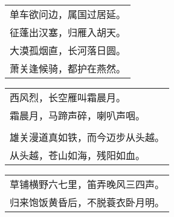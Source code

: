 \nopagebreak%
\nopagebreak%
\noindent\begin{minipage}{\linewidth}
  \vskip-3pt\begin{table}[H]
    \centering
    \begin{tabular}{@{}l@{}}
单车欲问边，属国过居延。\\
征蓬出汉塞，归雁入胡天。\\
大漠孤烟直，长河落日圆。\\
萧关逢候骑，都护在燕然。
    \end{tabular}
  \end{table}
\end{minipage}
\vspace{1cm}


\nopagebreak%
\nopagebreak%
\noindent\begin{minipage}{\linewidth}
  \vskip-3pt\begin{table}[H]
    \centering
    \begin{tabular}{@{}l@{}}
西风烈，长空雁叫霜晨月。\\
霜晨月，马蹄声碎，喇叭声咽。\\
\\
雄关漫道真如铁，而今迈步从头越。\\
从头越，苍山如海，残阳如血。
    \end{tabular}
  \end{table}
\end{minipage}
\vspace{1cm}


\nopagebreak%
\nopagebreak%
\noindent\begin{minipage}{\linewidth}
  \vskip-3pt\begin{table}[H]
    \centering
    \begin{tabular}{@{}l@{}}
草铺横野六七里，笛弄晚风三四声。\\
归来饱饭黄昏后，不脱蓑衣卧月明。
    \end{tabular}
  \end{table}
\end{minipage}
\vspace{1cm}


